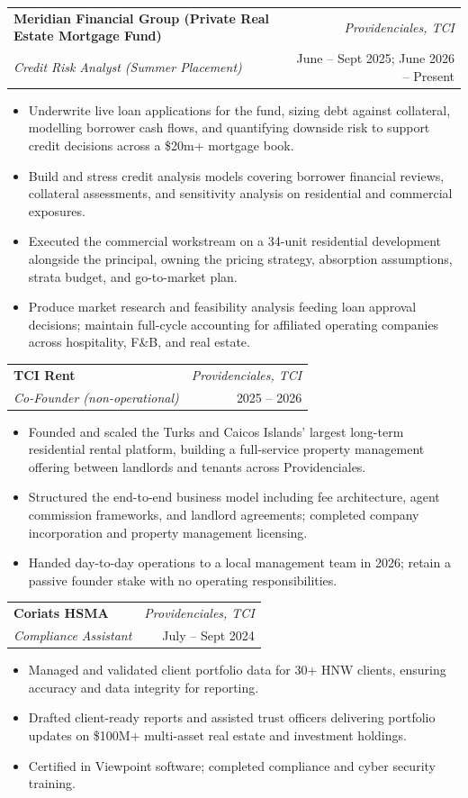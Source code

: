 \documentclass[10pt, a4paper]{article}
\makeatletter
\newcommand{\entry}[4]{%
  \noindent
  \begin{tabularx}{\linewidth}{@{}X r@{}}
    \textbf{#1} & {\small\textit{#2}} \\[-2pt]
    \textit{#3} & {\small #4}
  \end{tabularx}\vspace{1pt}%
}
\makeatother
\begin{document}
\entry{Meridian Financial Group (Private Real Estate Mortgage Fund)}{Providenciales, TCI}
  {Credit Risk Analyst (Summer Placement)}{June -- Sept 2025; June 2026 -- Present}
\begin{itemize}
  \item Underwrite live loan applications for the fund, sizing debt against collateral, modelling borrower cash flows, and quantifying downside risk to support credit decisions across a \$20m+ mortgage book.
  \item Build and stress credit analysis models covering borrower financial reviews, collateral assessments, and sensitivity analysis on residential and commercial exposures.
  \item Executed the commercial workstream on a 34-unit residential development alongside the principal, owning the pricing strategy, absorption assumptions, strata budget, and go-to-market plan.
  \item Produce market research and feasibility analysis feeding loan approval decisions; maintain full-cycle accounting for affiliated operating companies across hospitality, F\&B, and real estate.
\end{itemize}

\vspace{4pt}
\entry{TCI Rent}{Providenciales, TCI}
  {Co-Founder (non-operational)}{2025 -- 2026}
\begin{itemize}
  \item Founded and scaled the Turks and Caicos Islands' largest long-term residential rental platform, building a full-service property management offering between landlords and tenants across Providenciales.
  \item Structured the end-to-end business model including fee architecture, agent commission frameworks, and landlord agreements; completed company incorporation and property management licensing.
  \item Handed day-to-day operations to a local management team in 2026; retain a passive founder stake with no operating responsibilities.
\end{itemize}

\vspace{4pt}
\entry{Coriats HSMA}{Providenciales, TCI}
  {Compliance Assistant}{July -- Sept 2024}
\begin{itemize}
  \item Managed and validated client portfolio data for 30+ HNW clients, ensuring accuracy and data integrity for reporting.
  \item Drafted client-ready reports and assisted trust officers delivering portfolio updates on \$100M+ multi-asset real estate and investment holdings.
  \item Certified in Viewpoint software; completed compliance and cyber security training.
\end{itemize}
\end{document}
